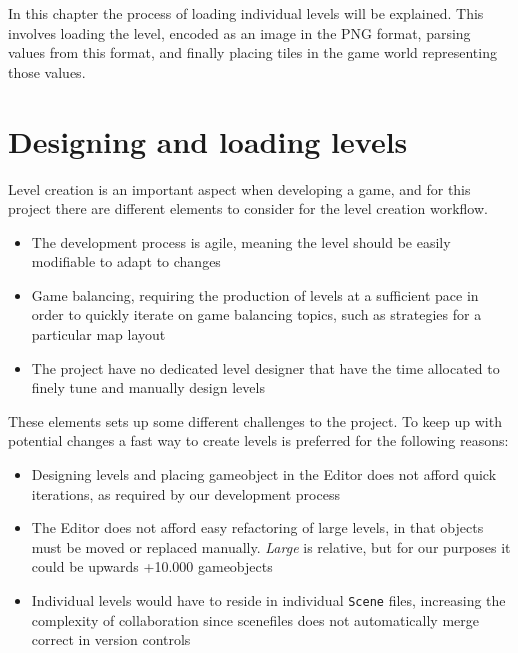 In this chapter the process of loading individual levels will be explained. This involves loading the level, encoded as an image in the PNG format, parsing values from this format, and finally placing tiles in the game world representing those values.

\section{Designing and loading levels}
Level creation is an important aspect when developing a game, and for this project there are different elements to consider for the level creation workflow.
\begin{itemize}
    \item The development process is agile, meaning the level should be easily modifiable to adapt to changes
    \item Game balancing, requiring the production of levels at a sufficient pace in order to quickly iterate on game balancing topics, such as strategies for a particular map layout
    \item The project have no dedicated level designer that have the time allocated to finely tune and manually design levels
\end{itemize}
These elements sets up some different challenges to the project.  
To keep up with potential changes a fast way to create levels is preferred for the following reasons:
\begin{itemize}
    \item Designing levels and placing gameobject in the Editor does not afford quick iterations, as required by our development process
    \item The Editor does not afford easy refactoring of large levels, in that objects must be moved or replaced manually. \textit{Large} is relative, but for our purposes it could be upwards +10.000 gameobjects
    \item Individual levels would have to reside in individual \texttt{Scene} files, increasing the complexity of collaboration since scenefiles does not  automatically merge correct in version controls
\end{itemize}

